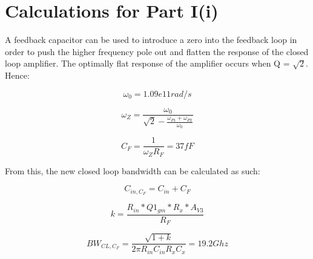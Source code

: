 \documentclass[12pt,a4paper]{article}
\begin{document}
\pagebreak


\section{Calculations for Part I(i)}



A feedback capacitor can be used to introduce a zero into the feedback loop in
order to push the higher frequency pole out and flatten the response of the
closed loop amplifier. The optimally flat response of the amplifier occurs when Q = $\sqrt{2}$. Hence:

\begin{equation}
  \omega_0 = 1.09e11 rad/s
\end{equation}

\begin{equation}
  \omega_Z = \frac{\omega_{0}}{\sqrt{2} - \frac{\omega_{P1} + \omega_{P2}}{\omega_{0}}}
\end{equation}

\begin{equation}
  C_F = \frac{1}{\omega_Z R_F} = 37fF
\end{equation}

From this, the new closed loop bandwidth can be calculated as such:

\begin{equation}
  C_{in,C_F} = C_{in} + C_F
\end{equation}

\begin{equation}
  k = \frac{R_{in} * Q1_{gm} * R_x * A_{V3}}{R_F}
\end{equation}

\begin{equation}
  BW_{CL,C_F} = \frac{\sqrt{1 + k}}{2 \pi R_{in} C_{in} R_x C_x} = 19.2Ghz
\end{equation}
\end{document}
